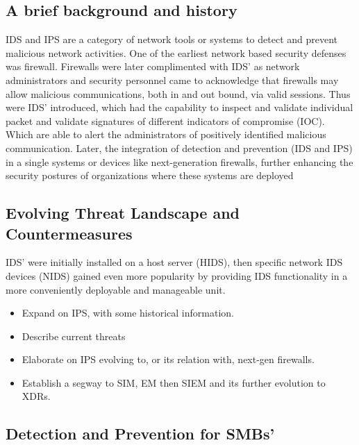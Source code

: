
\subsection{A brief background and history}

IDS and IPS are a category of network tools or systems to detect and prevent malicious network activities. One of the earliest network based security defenses was firewall. Firewalls were later complimented with IDS' as network administrators and security personnel came to acknowledge that firewalls may allow malicious communications, both in and out bound, via valid sessions. Thus were IDS' introduced, which had the capability to inspect and validate individual packet and validate signatures of different indicators of compromise (IOC). Which are able to alert the administrators of positively identified malicious communication. Later, the integration of detection and prevention (IDS and IPS) in a single systems or devices like next-generation firewalls, further enhancing the security postures of organizations where these systems are deployed

\subsection{Evolving Threat Landscape and Countermeasures}

IDS' were initially installed on a host server (HIDS), then specific network IDS devices (NIDS) gained even more popularity by providing IDS functionality in a more conveniently deployable and manageable unit.

\begin{followup}[to-do]
    \begin{itemize}
        \item Expand on IPS, with some historical information.
        \item Describe current threats
        \item Elaborate on IPS evolving to, or its relation with, next-gen firewalls.
        \item Establish a segway to SIM, EM then SIEM and its further evolution to XDRs.
    \end{itemize}
\end{followup}

\subsection{Detection and Prevention for SMBs'}

